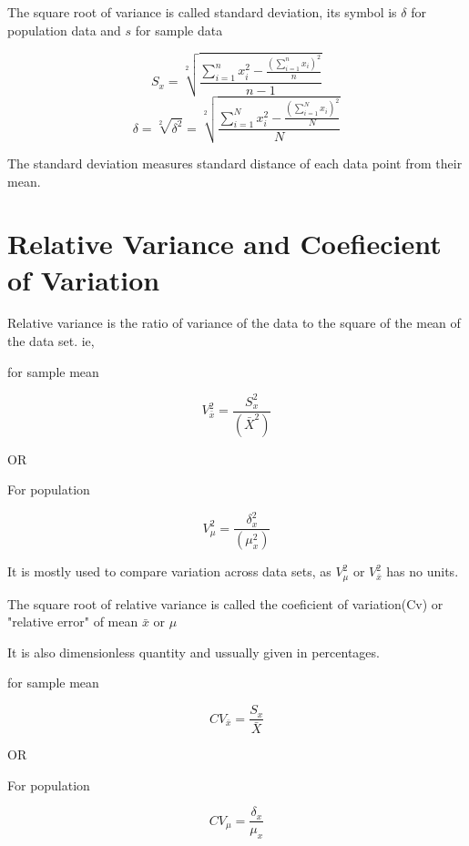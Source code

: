 The square root of variance is called standard deviation, its symbol is $\delta$ for population data and $s$ for sample data

\begin{equation}
    S_x = \sqrt[2]{\frac{\sum_{i = 1}^{n} x_i^2 - \frac{(\sum_{i = 1}^{n}x_i)^2}{n}}{n-1}}
\end{equation}
\begin{equation}
    \delta = \sqrt[2]{\delta^2} = \sqrt[2]{\frac{\sum_{i = 1}^{N} x_i^2 - \frac{(\sum_{i = 1}^{N}x_i)^2}{N}}{N}}
\end{equation}

The standard deviation measures standard distance of each data point from their mean.
\section{Relative Variance and Coefiecient of Variation}

Relative variance is the ratio of variance of the data to the square of the mean of the data set. ie,
\begin{center}
    for sample mean
\end{center}
\begin{equation}
    V_{\bar{x}}^2 = \frac{S_x^2}{(\bar{X}^2)}
\end{equation}
\begin{center}
    OR
\end{center}
\begin{center}
    For population
\end{center}
\begin{equation}
    V_{\mu}^2 = \frac{\delta_x^2}{(\mu_x^2)}
\end{equation}

It is mostly used to compare variation across data sets, as $V_{\mu}^2$ or $V_{\bar{x}}^2$ has no units.

The square root of relative variance is called the coeficient of variation(Cv) or "relative error" of mean $\bar{x}$ or $\mu$

It is also dimensionless quantity and ussually given in percentages.

\begin{center}
    for sample mean
\end{center}
\begin{equation}
    CV_{\bar{x}} = \frac{S_x}{\bar{X}}
\end{equation}
\begin{center}
    OR
\end{center}
\begin{center}
    For population
\end{center}
\begin{equation}
    CV_{\mu} = \frac{\delta_x}{\mu_x}
\end{equation}


